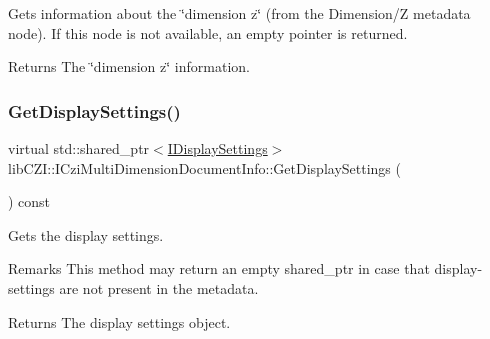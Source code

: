 Gets information about the \char`\"{}dimension z\char`\"{} (from the Dimension/Z metadata node). If this node is not available, an empty pointer is returned. \begin{DoxyReturn}{Returns}
The \char`\"{}dimension z\char`\"{} information. 
\end{DoxyReturn}
\mbox{\label{classlib_c_z_i_1_1_i_czi_multi_dimension_document_info_a8aff8239a31b047b737f80be0b2c9bda}} 
\subsubsection{\texorpdfstring{Get\+Display\+Settings()}{GetDisplaySettings()}}
{\footnotesize\ttfamily virtual std\+::shared\+\_\+ptr$<$\hyperlink{classlib_c_z_i_1_1_i_display_settings}{I\+Display\+Settings}$>$ lib\+C\+Z\+I\+::\+I\+Czi\+Multi\+Dimension\+Document\+Info\+::\+Get\+Display\+Settings (\begin{DoxyParamCaption}{ }\end{DoxyParamCaption}) const\hspace{0.3cm}{\ttfamily [pure virtual]}}

Gets the display settings. \begin{DoxyRemark}{Remarks}
This method may return an empty shared\+\_\+ptr in case that display-\/settings are not present in the metadata. 
\end{DoxyRemark}
\begin{DoxyReturn}{Returns}
The display settings object. 
\end{DoxyReturn}
\mbox{\label{classlib_c_z_i_1_1_i_czi_multi_dimension_document_info_aefea877fc65e9510d9a3127e366cb85c}} 
